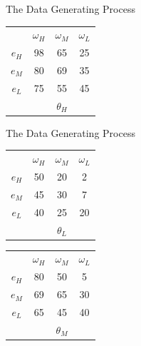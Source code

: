 \documentclass[aspectratio=169]{beamer}
\begin{document}
\begin{frame}{The Data Generating Process}
\begin{tabular}{ c|c|c|c|}
  \multicolumn{1}{c}{} & \multicolumn{1}{c}{$\omega_H$} & \multicolumn{1}{c}{$\omega_M$} & \multicolumn{1}{c}{$\omega_L$}\\
  \cline{2-4}
  $e_H$ & 98 & 65 & 25 \\
  \cline{2-4}
  $e_M$ & 80 & 69 & 35 \\
  \cline{2-4}
  $e_L$ & 75 & 55 & 45 \\
  \cline{2-4}
  \multicolumn{1}{c}{} & \multicolumn{1}{c}{} & \multicolumn{1}{c}{$\theta_H$} & \multicolumn{1}{c}{}\\
\end{tabular}


    
\end{frame}

\begin{frame}{The Data Generating Process}
    \centering
\begin{tabular}{ c|c|c|c|}
  
  \multicolumn{1}{c}{} & \multicolumn{1}{c}{$\omega_H$} & \multicolumn{1}{c}{$\omega_M$} & \multicolumn{1}{c}{$\omega_L$}\\
  \cline{2-4}
  $e_H$ & \cellcolor{blue!25}50 & 20 & 2 \\
  \cline{2-4}
  $e_M$ & 45 & \cellcolor{blue!25}30 & 7 \\
  \cline{2-4}
  $e_L$ & 40 & 25 & \cellcolor{blue!25}20 \\
  \cline{2-4}
  \multicolumn{1}{c}{} & \multicolumn{1}{c}{} & \multicolumn{1}{c}{$\theta_L$} & \multicolumn{1}{c}{}\\
\end{tabular}
\hspace{.3cm} %
\begin{tabular}{ c|c|c|c|}
  
  \multicolumn{1}{c}{} & \multicolumn{1}{c}{$\omega_H$} & \multicolumn{1}{c}{$\omega_M$} & \multicolumn{1}{c}{$\omega_L$}\\
  \cline{2-4}
  $e_H$ & \cellcolor{blue!25}80 & 50 & 5 \\
  \cline{2-4}
  $e_M$ & 69 & \cellcolor{blue!25}65 & 30 \\
  \cline{2-4}
  $e_L$ & 65 & 45 & \cellcolor{blue!25}40 \\
  \cline{2-4}
  \multicolumn{1}{c}{} & \multicolumn{1}{c}{} & \multicolumn{1}{c}{$\theta_M$} & \multicolumn{1}{c}{}\\
\end{tabular}
\hspace{.3cm} %
\begin{tabular}{ c|c|c|c|}
  

\end{tabular}
\end{frame}
\end{document}

